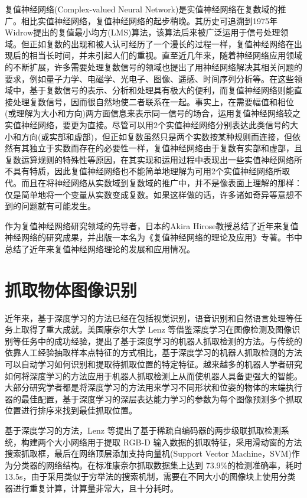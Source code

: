\documentclass{hitszthesis}
\begin{document}
复值神经网络(Complex-valued Neural Network)是实值神经网络在复数域的推广。相比实值神经网络，复值神经网络的起步稍晚。其历史可追溯到1975年Widrow提出的复值最小均方(LMS)算法，该算法后来被广泛运用于信号处理领域。但正如复数的出现和被人认可经历了一个漫长的过程一样，复值神经网络在出现后的相当长时间，并未引起人们的重视。直至近几年来，随着神经网络应用领域的不断扩展，许多需要处理复数信号的领域也提出了用神经网络解决其相关问题的要求，例如量子力学、电磁学、光电子、图像、遥感、时间序列分析等。在这些领域中，基于复数信号的表示、分析和处理具有极大的便利，而复值神经网络则能直接处理复数信号，因而很自然地使二者联系在一起。事实上，在需要幅值和相位(或理解为大小和方向)两方面信息来表示同一信号的场合，运用复值神经网络较之实值神经网络，要更为直接。尽管可以用2个实值神经网络分别表达此类信号的大小和方向(或实部和虚部)，但正如复数虽然只是两个实数按某种规则而连接，但依然有其独立于实数而存在的必要性一样，复值神经网络由于复数有实部和虚部，且复数运算规则的特殊性等原因，在其实现和运用过程中表现出一些实值神经网络所不具有特质，因此复值神经网络也不能简单地理解为可用2个实值神经网络所取代。而且在将神经网络从实数域到复数域的推广中，并不是像表面上理解的那样：仅是简单地将一个变量从实数变成复数。如果这样做的话，许多诸如奇异等意想不到的问题就有可能发生。

作为复值神经网络研究领域的先导者，日本的Akira Hirose教授总结了近年来复值神经网络的研究成果，并出版一本名为《复值神经网络的理论及应用》专著。书中总结了近年来复值神经网络理论的发展和应用情况。

\section{抓取物体图像识别}

近年来，基于深度学习的方法已经在包括视觉识别，语音识别和自然语言处理等任务上取得了重大成就。美国康奈尔大学 Lenz 等借鉴深度学习在图像检测及图像识别等任务中的成功经验，提出了基于深度学习的机器人抓取检测的方法。与传统的依靠人工经验抽取样本点特征的方式相比，基于深度学习的机器人抓取检测的方法可以自动学习如何识别和提取待抓取位置的特定特征。越来越多的机器人学者研究如何将深度学习的方法应用于机器人抓取检测上从而使机器人具备更强大的智能。大部分研究学者都是将深度学习的方法用来学习不同形状和位姿的物体的末端执行器的最佳配置，基于深度学习的深层表达能力学习的参数为每个图像预测多个抓取位置进行排序来找到最佳抓取位置。

基于深度学习的方法，Lenz 等提出了基于稀疏自编码器的两步级联抓取检测系统，构建两个大小网络用于提取 RGB-D 输入数据的抓取特征，采用滑动窗的方法搜索抓取框，最后在网络顶层添加支持向量机(Support Vector Machine，SVM)作为分类器的网络结构。在标准康奈尔抓取数据集上达到 73.9\%的检测准确率，耗时13.5s，由于采用类似于穷举法的搜索机制，需要在不同大小的图像块上使用分类器进行重复计算，计算量非常大，且十分耗时。
\end{document}
